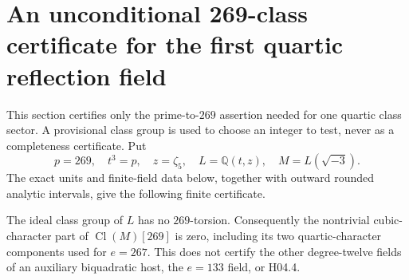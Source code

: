 \section{An unconditional 269-class certificate for the first quartic reflection field}
\label{sec:cubic-quartic-class-certificate}

This section certifies only the prime-to-$269$ assertion needed for
one quartic class sector.  A provisional class group is used to choose
an integer to test, never as a completeness certificate.  Put
\[
 p=269,\quad t^3=p,\quad z=\zeta_5,\quad
 L=\mathbb Q(t,z),\quad M=L(\sqrt{-3}).
 \tag{QCC.1}
\]
The exact units and finite-field data below, together with outward
rounded analytic intervals, give the following finite certificate.

\begin{theorem}
\label{AC-G129-quartic-class}
The ideal class group of $L$ has no $269$-torsion.  Consequently the
nontrivial cubic-character part of $\operatorname{Cl}(M)[269]$ is zero,
including its two quartic-character components used for $e=267$.
This does not certify the other degree-twelve fields of an auxiliary
biquadratic host, the $e=133$ field, or H04.4.
\end{theorem}

